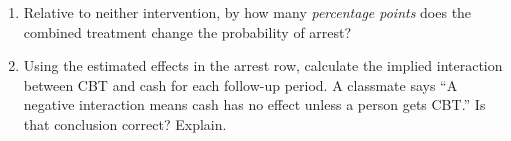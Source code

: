 \documentclass[12pt]{article}
\begin{document}
\begin{enumerate}
\begin{enumerate}
%
%
%
%
%
%
%
%
%
%
%
%


\item Relative to neither intervention, by how many \emph{percentage points} does the combined treatment change the probability of arrest?
\vspace{4cm}

\item Using the estimated effects in the arrest row, calculate the implied interaction between CBT and cash for each follow-up period. A classmate says ``A negative interaction means cash has no effect unless a person gets CBT.'' Is that conclusion correct? Explain.
\vspace{4cm}
\end{enumerate}
\vspace{8ex}


\end{enumerate}
\end{document}
